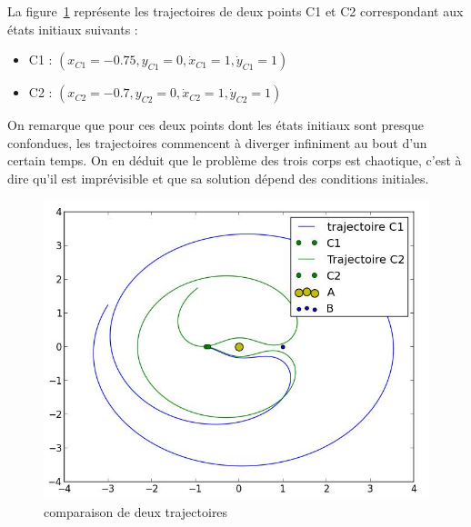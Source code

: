 La figure~\ref{cmp} représente les trajectoires de deux points C1 et C2 correspondant aux états initiaux suivants :
\begin{itemize}
\item C1 : $(x_{C1} = -0.75, y_{C1} = 0, \dot x_{C1} = 1, \dot y_{C1} = 1)$
\item C2 : $(x_{C2} = -0.7, y_{C2} = 0, \dot x_{C2} = 1, \dot y_{C2} = 1)$
\end{itemize}
On remarque que pour ces deux points dont les états initiaux sont presque confondues, les trajectoires commencent à diverger infiniment au bout d'un certain temps. On en déduit que le problème des trois corps est chaotique, c'est à dire qu'il est imprévisible et que sa solution dépend des conditions initiales.
\begin{figure}[h]
\centering
\includegraphics[scale = 0.4]{comparaison.png}
\caption{comparaison de deux trajectoires}
\label{cmp}
\end{figure}





